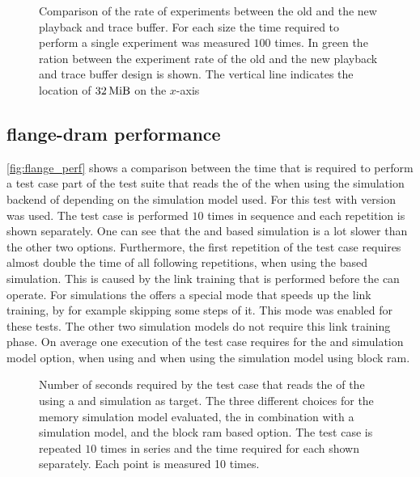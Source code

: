 \begin{figure}[H]
\caption{Comparison of the rate of experiments between the old and the new playback and trace buffer. For each size the time required to perform a single experiment was measured $\num{100}$ times. In green the ration between the experiment rate of the old and the new playback and trace buffer design is shown. The vertical line indicates the location of $\SI{32}{\mebi\byte}$ on the $x$-axis}\label{fig:experimentrate}
\end{figure}

\subsection{flange-dram performance}
\autoref{fig:flange_perf} shows a comparison between the time that is required to perform a test case part of the \hxcomm{} test suite that reads the \JTAGID{} of the \ASIC{} when using the simulation backend of \hxcomm{} depending on the \AXI{} \DDR{} simulation model used. For this test \xcelium{} with version \xceliumVer{} was used. The test case is performed $\num{10}$ times in sequence and each repetition is shown separately. One can see that the \XilinxMIG{} and \DDR{} based simulation is a lot slower than the other two options. Furthermore, the first repetition of the test case requires almost double the time of all following repetitions, when using the \XilinxMIG{} based simulation. This is caused by the link training that is performed before the \XilinxMIG{} can operate. For simulations the \XilinxMIG{} offers a special mode that speeds up the link training, by for example skipping some steps of it. This mode was enabled for these tests. The other two simulation models do not require this link training phase. On average one execution of the test case requires  for the \XilinxMIG{} and \DDR{} simulation model option,  when using \flangedram{} and  when using the simulation model using block ram.


\begin{figure}[H]
\caption{Number of seconds required by the \hxcomm{} test case that reads the \JTAGID{} of the \ASIC{} using a \FPGA{} and \ASIC{} simulation as target. The three different choices for the \AXI{} \DDR{} memory simulation model evaluated, the \XilinxMIG{} in combination with a \DDR{} simulation model, \flangedram{} and the block ram based option. The \hxcomm{} test case is repeated $\num{10}$ times in series and the time required for each shown separately. Each point is measured 10 times.}\label{fig:flange_perf}
\end{figure}

